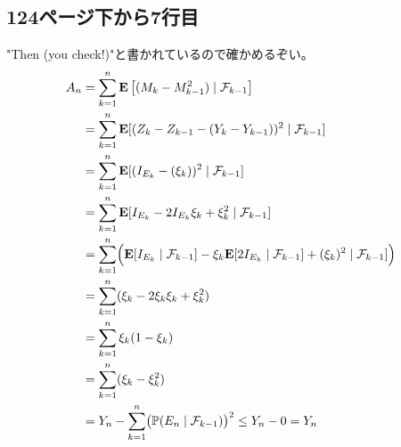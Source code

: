   \subsection{124ページ下から7行目}
    "Then (you check!)"と書かれているので確かめるぞい。
    \begin{align*}
      A_n &= \sum_{k=1}^n {\mathbf{E}}\left[(M_k - M_{k-1}^2) \mid \mathcal{F}_{k-1}\right] \\
      &= \sum_{k=1}^n {\mathbf{E}}[(Z_k - Z_{k-1} - (Y_k - Y_{k-1}))^2 \mid \mathcal{F}_{k-1}]\\
      &= \sum_{k=1}^n {\mathbf{E}}[(I_{E_k} - (\xi_k))^2 \mid \mathcal{F}_{k-1}]\\
      &= \sum_{k=1}^n {\mathbf{E}}[I_{E_k} - 2I_{E_k}\xi_k  + \xi_k^2 \mid \mathcal{F}_{k-1}]\\
      &= \sum_{k=1}^n \Bigl({\mathbf{E}}[I_{E_k} \mid \mathcal{F}_{k-1}] - \xi_k{\mathbf{E}}[2I_{E_k} \mid \mathcal{F}_{k-1}]  + (\xi_k)^2 \mid \mathcal{F}_{k-1}] \Bigr)\\
      &= \sum_{k=1}^n (\xi_k -2\xi_k\xi_k + \xi_k^2) \\
      &= \sum_{k=1}^n \xi_k(1 - \xi_k) \\
      &= \sum_{k=1}^n (\xi_k - \xi_k^2) \\
      &= Y_n - \sum_{k=1}^n \bigl( {\mathbb{P}}(E_n \mid \mathcal{F}_{k-1}) \bigr)^2 \leq Y_n - 0 = Y_n
    \end{align*}
